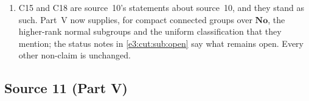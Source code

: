 \documentclass[11pt,letterpaper]{article}
\numberwithin{equation}{section}
\theoremstyle{definition}
\theoremstyle{remark}
\newcommand{\No}{\mathbf{No}}
\begin{document}
\begin{enumerate}[label=\textup{M\arabic*.},leftmargin=2.6em]
 renamings of \cref{e3:cpt:sub:notation} change symbols, not statements. The
 wording of \cref{e3:cpt:thm:fullnormal} restores its intended meaning, a proper
 subgroup that may be a set or a class, and the change is disclosed after it.
\item C15 and C18 are source~10's statements about source~10, and they stand as
 such. Part~V now supplies, for compact connected groups over $\No$, the
 higher-rank normal subgroups and the uniform classification that they mention;
 the status notes in \cref{e3:cut:sub:open} say what remains open. Every other
 non-claim is unchanged.
\end{enumerate}

\subsection{Source 11 (Part V)}\label{e3:cpt:sub:nonclaims11}
\end{document}

